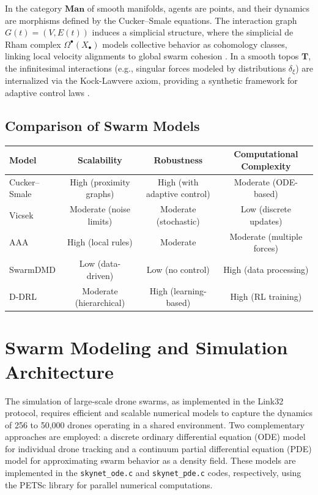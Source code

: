 \documentclass{article}
\theoremstyle{plain}
\newcommand{\cat}[1]{\mathbf{#1}}
\begin{document}
In the category \(\cat{Man}\) of smooth manifolds, agents are points, and their dynamics are
morphisms defined by the Cucker--Smale equations. The interaction graph \(G(t) = (V, E(t))\)
induces a simplicial structure, where the simplicial de Rham complex \(\Omega^\bullet(X_\bullet)\)
models collective behavior as cohomology classes, linking local velocity alignments to global swarm
cohesion \cite{nLab_simplicial_de_Rham}. In a smooth topos \(\cat{T}\), the infinitesimal
interactions (e.g., singular forces modeled by distributions \(\delta_\xi\)) are
internalized via the Kock-Lawvere axiom, providing a synthetic framework for
adaptive control laws \cite{nLab_synthetic_diff_geom}.

\subsection{Comparison of Swarm Models}
\hspace*{-2cm}
\begin{tabular}{lccc}
\hline
\textbf{Model} & \textbf{Scalability} & \textbf{Robustness} & \textbf{Computational Complexity} \\
\hline
Cucker--Smale & High (proximity graphs) & High (with adaptive control) & Moderate (ODE-based) \\
Vicsek & Moderate (noise limits) & Moderate (stochastic) & Low (discrete updates) \\
AAA & High (local rules) & Moderate & Moderate (multiple forces) \\
SwarmDMD & Low (data-driven) & Low (no control) & High (data processing) \\
D-DRL & Moderate (hierarchical) & High (learning-based) & High (RL training) \\
\hline
\end{tabular}


\section{Swarm Modeling and Simulation Architecture}

The simulation of large-scale drone swarms, as implemented in the Link32 protocol,
requires efficient and scalable numerical models to capture the dynamics of 256 to
50,000 drones operating in a shared environment. Two complementary approaches are
employed: a discrete ordinary differential equation (ODE) model for individual
drone tracking and a continuum partial differential equation (PDE) model for
approximating swarm behavior as a density field. These models are implemented
in the \texttt{skynet\_ode.c} and \texttt{skynet\_pde.c} codes, respectively,
using the PETSc library for parallel numerical computations.
\end{document}
